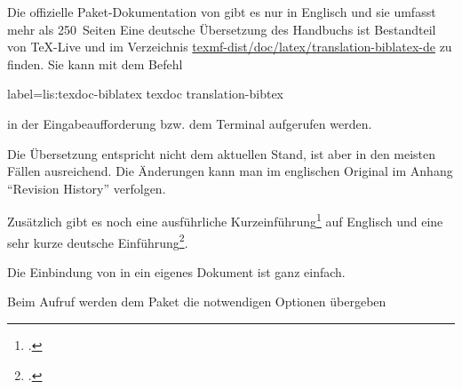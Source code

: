 Die offizielle Paket-Dokumentation von \biblatex{} gibt es nur in Englisch und sie umfasst mehr als 250~Seiten
Eine deutsche Übersetzung des Handbuchs ist Bestandteil von TeX-Live und im Verzeichnis 
\url{texmf-dist/doc/latex/translation-biblatex-de} zu finden.
Sie kann mit dem Befehl

\begin{lfgwcode}{label={lis:texdoc-biblatex}}
texdoc translation-bibtex
\end{lfgwcode}

in der Eingabeaufforderung bzw. dem Terminal aufgerufen werden.

Die Übersetzung entspricht nicht dem aktuellen Stand, ist aber in den meisten Fällen ausreichend.
Die Änderungen kann man im englischen Original im Anhang \enquote{Revision History} verfolgen.

Zusätzlich gibt es noch eine ausführliche Kurzeinführung\footcite{biblatex-tutorial} auf Englisch 
und eine sehr kurze deutsche Einführung\footcite{biblatex-bottcher}.

Die Einbindung von \biblatex{} in ein eigenes Dokument ist ganz einfach.


Beim Aufruf werden dem Paket die notwendigen Optionen übergeben

